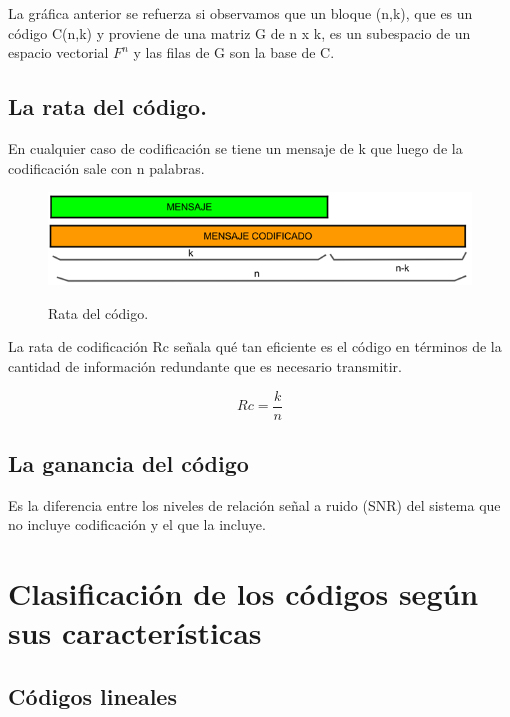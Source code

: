 La gráfica anterior se refuerza si observamos que un bloque (n,k), que es un código C(n,k) y proviene de una matriz G de n x k, es un subespacio de un espacio vectorial $F^{n}$ y las filas de G son la base de C.

\subsection{La rata del código.}

En cualquier caso de codificación se tiene un mensaje de k que luego de la codificación sale con n palabras.

\begin{figure}[h!]
	\captionsetup{justification = raggedright, singlelinecheck = false}
	\caption{Rata del código.} 
	\centering
	\includegraphics[scale=1]{Imagenes/Mensaje.png}
	\label{fig:Mensaje}
\end{figure}

La rata de codificación Rc señala qué tan eficiente es el código en términos de la cantidad de información redundante que es necesario transmitir.

\begin{equation} \label{capsiete_diesisiete}
Rc = \dfrac{k}{n}
\end{equation}

\subsection{La ganancia del código}

Es la diferencia entre los niveles de relación señal a ruido (SNR) del sistema que no incluye codificación y el que la incluye.

\section{Clasificación de los códigos según sus características}

\subsection{Códigos lineales}

